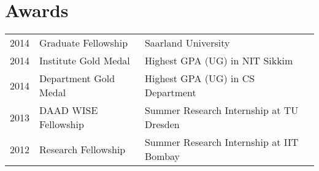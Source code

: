 \documentclass[]{deedy-resume-openfont}
\begin{document}
\begin{minipage}[t]{0.66\textwidth}
\section{Awards} 
\begin{tabular}{rll}
2014	     & Graduate Fellowship & Saarland University\\
2014	     & Institute Gold Medal  & Highest GPA (UG) in NIT Sikkim\\
2014	     & Department Gold Medal  & Highest GPA (UG) in CS Department\\
2013	     & DAAD WISE Fellowship  & Summer Research Internship at TU Dresden\\
2012	     & Research Fellowship  & Summer Research Internship at IIT Bombay\\
\end{tabular}

\end{minipage} 
\end{document}
